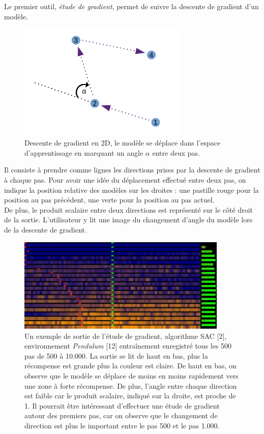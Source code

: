 \documentclass[12pt]{article}
\begin{document}
Le premier outil, \emph{étude de gradient}, permet de suivre la descente de gradient d’un modèle. \\

\begin{figure}[!htp]
    \centering
    \includegraphics[width=8cm]{Images/gradientStudy_dessus}
    \caption{Descente de gradient en 2D, le modèle se déplace dans l'espace d'apprentissage en marquant un angle $\alpha$ entre deux pas.}
    \label{fig:gradientStudyAbove}
\end{figure}

Il consiste à prendre comme lignes les directions prises par la descente de gradient à chaque pas. Pour avoir une idée du déplacement effectué entre deux pas, on indique la position relative des modèles sur les droites : une pastille rouge pour la position au pas précédent, une verte pour la position au pas actuel. \\

De plus, le produit scalaire entre deux directions est représenté sur le côté droit de la sortie. L'utilisateur y lit une image du changement d'angle du modèle lors de la descente de gradient. \\

\begin{figure}[!htp]
    \centering
    \includegraphics[width=10cm]{Images/gradientStudy}
    \caption{Un exemple de sortie de l'étude de gradient, algorithme SAC [2], environnement \emph{Pendulum} [12] entraînement enregistré tous les 500 pas de 500 à 10.000. La sortie se lit de haut en bas, plus la récompense est grande plus la couleur est claire. De haut en bas, on observe que le modèle se déplace de moins en moins rapidement vers une zone à forte récompense. De plus, l'angle entre chaque direction est faible car le produit scalaire, indiqué sur la droite, est proche de 1. Il pourrait être intéressant d'effectuer une étude de gradient autour des premiers pas, car on observe que le changement de direction est plus le important entre le pas 500 et le pas 1.000.}
    \label{fig:gradientStudy}
\end{figure}
\end{document}
